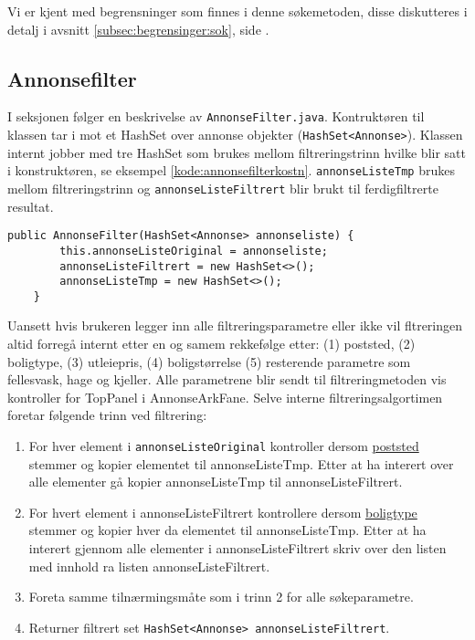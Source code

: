 Vi er kjent med begrensninger som finnes i denne søkemetoden, disse diskutteres i detalj i avsnitt \ref{subsec:begrensinger:sok}, side \pageref{subsec:begrensinger:sok}.

\subsection{Annonsefilter}
I seksjonen følger en beskrivelse av \texttt{AnnonseFilter.java}. Kontruktøren til klassen tar i mot et HashSet over annonse objekter (\texttt{HashSet<Annonse>}). Klassen internt jobber med tre HashSet som brukes mellom filtreringstrinn hvilke blir satt i konstruktøren, se eksempel \ref{kode:annonsefilterkostn}. \texttt{annonseListeTmp} brukes mellom filtreringstrinn og \texttt{annonseListeFiltrert} blir brukt til ferdigfiltrerte resultat.  

\begin{lstlisting}[caption=AnnonseFilter.java: Konstruktør, label=kode:annonsefilterkostn]
    public AnnonseFilter(HashSet<Annonse> annonseliste) {
        this.annonseListeOriginal = annonseliste;
        annonseListeFiltrert = new HashSet<>();
        annonseListeTmp = new HashSet<>();
    }
\end{lstlisting}

Uansett hvis brukeren legger inn alle filtreringsparametre eller ikke vil fltreringen altid forregå internt etter en og samem rekkefølge etter: (1) poststed, (2) boligtype, (3) utleiepris, (4) boligstørrelse (5) resterende parametre som fellesvask, hage og kjeller. Alle parametrene blir sendt til filtreringmetoden vis kontroller for TopPanel i AnnonseArkFane. Selve interne filtreringsalgortimen foretar følgende trinn ved filtrering:
\begin{enumerate}
\item For hver element i \texttt{annonseListeOriginal} kontroller dersom \underline{poststed} stemmer og kopier elementet til annonseListeTmp. Etter at ha interert over alle elementer gå kopier annonseListeTmp til annonseListeFiltrert. 
\item For hvert element i annonseListeFiltrert kontrollere dersom \underline{boligtype} stemmer og kopier hver da elementet til annonseListeTmp. Etter at ha interert gjennom alle elementer i annonseListeFiltrert skriv over den listen med innhold ra listen annonseListeFiltrert. 
\item Foreta samme tilnærmingsmåte som i trinn 2 for alle søkeparametre. 
\item Returner filtrert set \texttt{HashSet<Annonse> annonseListeFiltrert}.
\end{enumerate}

